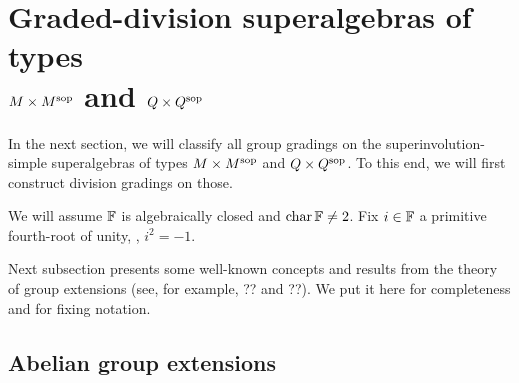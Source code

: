 \section[Graded-division superalgebras of types \texorpdfstring{$M \times M\sop$}{MxMsop} and \texorpdfstring{$Q \times Q\sop$}{QxQsop}]{Graded-division superalgebras of types \\ $M \times M\sop$ and $Q \times Q\sop$}

In the next section, we will classify all group gradings on the superinvolution-simple superalgebras of types $M \times M\sop$ and $Q \times Q\sop$. 
To this end, we will first construct division gradings on those. 

We will assume $\mathbb{F}$ is algebraically closed and $\operatorname{char} \mathbb{F} \neq 2$. 
Fix $i\in \mathbb{F}$ a primitive fourth-root of unity, \ie, $i^2 = -1$. 

Next subsection presents some well-known concepts and results from the theory of group extensions (see, for example, ?? and ??). 
We put it here for completeness and for fixing notation. 

\subsection{Abelian group extensions}


